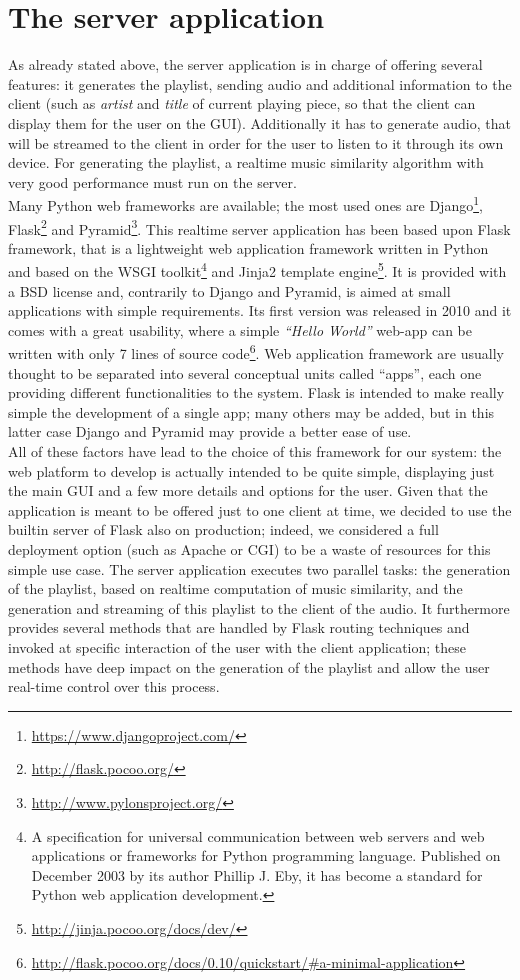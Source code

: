 \section{The server application}
\label{sec:rtserver}
As already stated above, the server application is in charge of offering several features: it generates the playlist, sending audio and additional information to the client (such as \textit{artist} and \textit{title} of current playing piece, so that the client can display them for the user on the GUI). Additionally it has to generate audio, that will be streamed to the client in order for the user to listen to it through its own device. For generating the playlist, a realtime music similarity algorithm with very good performance must run on the server. \\ Many Python web frameworks are available; the most used ones are Django\footnote{\url{https://www.djangoproject.com/}}, Flask\footnote{\url{http://flask.pocoo.org/}} and Pyramid\footnote{\url{http://www.pylonsproject.org/}}. This realtime server application has been based upon Flask framework, that is a lightweight web application framework written in Python and based on the WSGI toolkit\footnote{A specification for universal communication between web servers and web applications or frameworks for Python programming language. Published on December 2003 by its author Phillip J. Eby, it has become a standard for Python web application development.} and Jinja2 template engine\footnote{\url{http://jinja.pocoo.org/docs/dev/}}. It is provided with a BSD license and, contrarily to Django and Pyramid, is aimed at small applications with simple requirements. Its first version was released in 2010 and it comes with a great usability, where a simple \textit{``Hello World''} web-app can be written with only 7 lines of source code\footnote{\url{http://flask.pocoo.org/docs/0.10/quickstart/#a-minimal-application}}. Web application framework are usually thought to be separated into several conceptual units called ``apps'', each one providing different functionalities to the system. Flask is intended to make really simple the development of a single app; many others may be added, but in this latter case Django and Pyramid may provide a better ease of use. \\ All of these factors have lead to the choice of this framework for our system: the web platform to develop is actually intended to be quite simple, displaying just the main GUI and a few more details and options for the user. Given that the application is meant to be offered just to one client at time, we decided to use the builtin server of Flask also on production; indeed, we considered a full deployment option (such as Apache or CGI) to be a waste of resources for this simple use case. The server application executes two parallel tasks: the generation of the playlist, based on realtime computation of music similarity, and the generation and streaming of this playlist to the client of the audio. It furthermore provides several methods that are handled by Flask routing techniques and invoked at specific interaction of the user with the client application; these methods have deep impact on the generation of the playlist and allow the user real-time control over this process. 

